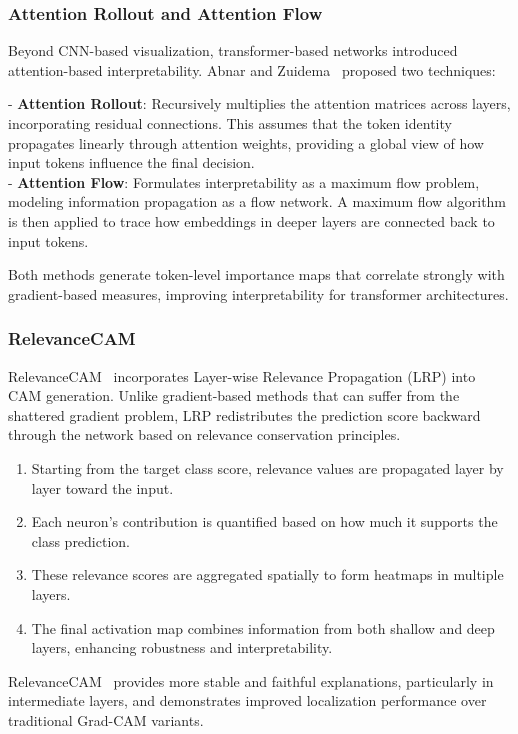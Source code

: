 \subsubsection{Attention Rollout and Attention Flow}
Beyond CNN-based visualization, transformer-based networks introduced attention-based interpretability. Abnar and Zuidema~\cite{attention_rollout} proposed two techniques:

- \textbf{Attention Rollout}: Recursively multiplies the attention matrices across layers, incorporating residual connections. This assumes that the token identity propagates linearly through attention weights, providing a global view of how input tokens influence the final decision. \\
- \textbf{Attention Flow}: Formulates interpretability as a maximum flow problem, modeling information propagation as a flow network. A maximum flow algorithm is then applied to trace how embeddings in deeper layers are connected back to input tokens.

Both methods generate token-level importance maps that correlate strongly with gradient-based measures, improving interpretability for transformer architectures.

\subsubsection{RelevanceCAM}
RelevanceCAM~\cite{relevance_cam} incorporates Layer-wise Relevance Propagation (LRP) into CAM generation. Unlike gradient-based methods that can suffer from the shattered gradient problem, LRP redistributes the prediction score backward through the network based on relevance conservation principles.

\begin{enumerate}
    \item Starting from the target class score, relevance values are propagated layer by layer toward the input.
    \item Each neuron's contribution is quantified based on how much it supports the class prediction.
    \item These relevance scores are aggregated spatially to form heatmaps in multiple layers.
    \item The final activation map combines information from both shallow and deep layers, enhancing robustness and interpretability.
\end{enumerate}

RelevanceCAM~\cite{relevance_cam} provides more stable and faithful explanations, particularly in intermediate layers, and demonstrates improved localization performance over traditional Grad-CAM variants.

